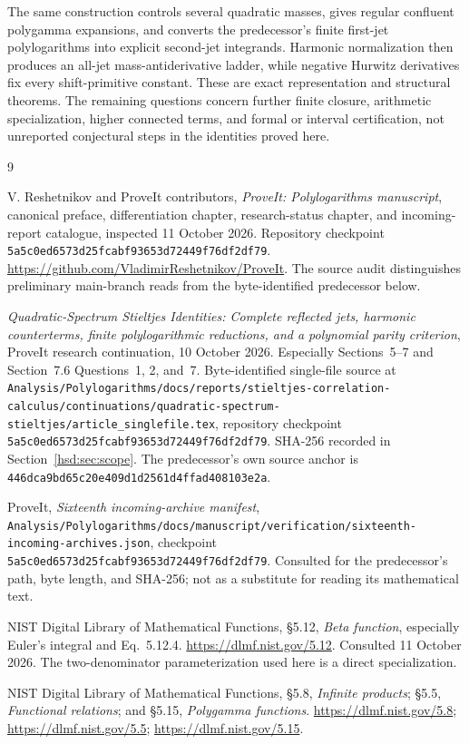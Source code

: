 \documentclass[11pt]{article}
\numberwithin{equation}{section}
\theoremstyle{definition}\newtheorem{definition}[theorem]{Definition}
\theoremstyle{remark}\newtheorem{remark}[theorem]{Remark}
\newcommand{\src}[1]{\nolinkurl{#1}}
\newcommand{\pin}{\src{5a5c0ed6573d25fcabf93653d72449f76df2df79}}
\begin{document}
The same construction controls several quadratic masses, gives regular
confluent polygamma expansions, and converts the predecessor's finite
first-jet polylogarithms into explicit second-jet integrands. Harmonic
normalization then produces an all-jet mass-antiderivative ladder, while
negative Hurwitz derivatives fix every shift-primitive constant.
These are exact representation and structural theorems. The remaining
questions concern further finite closure, arithmetic specialization,
higher connected terms, and formal or interval certification, not
unreported conjectural steps in the identities proved here.

\clearpage
\begin{thebibliography}{9}
\raggedright
{}
V. Reshetnikov and ProveIt contributors,
\emph{ProveIt: Polylogarithms manuscript}, canonical preface,
differentiation chapter, research-status chapter, and incoming-report
catalogue, inspected 11 October 2026. Repository checkpoint
\pin. \url{https://github.com/VladimirReshetnikov/ProveIt}.
The source audit distinguishes preliminary main-branch reads from the
byte-identified predecessor below.

\emph{Quadratic-Spectrum Stieltjes Identities: Complete reflected jets,
harmonic counterterms, finite polylogarithmic reductions, and a polynomial
parity criterion}, ProveIt research continuation, 10 October 2026.
Especially Sections~5--7 and Section~7.6 Questions~1, 2, and~7.
Byte-identified single-file source at
\src{Analysis/Polylogarithms/docs/reports/stieltjes-correlation-calculus/continuations/quadratic-spectrum-stieltjes/article_singlefile.tex},
repository checkpoint \pin. SHA-256 recorded in Section~\ref{hsd:sec:scope}.
The predecessor's own source anchor is
\src{446dca9bd65c20e409d1d2561d4ffad408103e2a}.

ProveIt, \emph{Sixteenth incoming-archive manifest},
\src{Analysis/Polylogarithms/docs/manuscript/verification/sixteenth-incoming-archives.json},
checkpoint \pin. Consulted for the predecessor's path, byte length, and
SHA-256; not as a substitute for reading its mathematical text.

NIST Digital Library of Mathematical Functions, \S5.12,
\emph{Beta function}, especially Euler's integral and Eq.~5.12.4.
\url{https://dlmf.nist.gov/5.12}. Consulted 11 October 2026.
The two-denominator parameterization used here is a direct specialization.

NIST Digital Library of Mathematical Functions, \S5.8,
\emph{Infinite products}; \S5.5, \emph{Functional relations}; and \S5.15,
\emph{Polygamma functions}.
\url{https://dlmf.nist.gov/5.8}; \url{https://dlmf.nist.gov/5.5};
\url{https://dlmf.nist.gov/5.15}.


\end{thebibliography}
\end{document}
